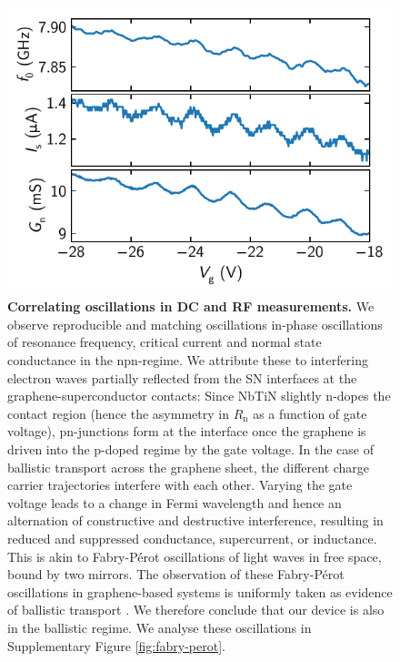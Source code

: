 \begin{figure}[]
	\centering
	\includegraphics[width=.6\linewidth]{chapter-gJJ/figs/si_corr_osc}
	\caption{\textbf{Correlating oscillations in DC and RF measurements.}
		We observe reproducible and matching oscillations in-phase oscillations of resonance frequency, critical current and normal state conductance in the npn-regime.
		We attribute these to interfering electron waves partially reflected from the SN interfaces at the graphene-superconductor contacts:
		Since NbTiN slightly n-dopes the contact region (hence the asymmetry in $R_\text{n}$ as a function of gate voltage), pn-junctions form at the interface once the graphene is driven into the p-doped regime by the gate voltage.
		In the case of ballistic transport across the graphene sheet, the different charge carrier trajectories interfere with each other.
		Varying the gate voltage leads to a change in Fermi wavelength and hence an alternation of constructive and destructive interference, resulting in reduced and suppressed conductance, supercurrent, or inductance.
		This is akin to Fabry-P\'erot oscillations of light waves in free space, bound by two mirrors.
		The observation of these Fabry-P\'erot oscillations in graphene-based systems is uniformly taken as evidence of ballistic transport \cite{liangFabryPerotInterference2001,miaoPhaseCoherentTransportGraphene2007,youngQuantumInterferenceKlein2009,choMasslessMassiveParticleinabox2011,wuQuantumBehaviorGraphene2012,camposQuantumClassicalConfinement2012,rickhausBallisticInterferencesSuspended2013,benshalomQuantumOscillationsCritical2015,caladoBallisticJosephsonJunctions2015d,ametSupercurrentQuantumHall2016b,borzenetsBallisticGrapheneJosephson2016a,allenObservationElectronCoherence2017,zhuSupercurrentMultipleAndreev2018}.
		We therefore conclude that our device is also in the ballistic regime.
		We analyse these oscillations in Supplementary Figure \ref{fig:fabry-perot}.
	} 
	\label{fig:quantum_osc}
\end{figure}

